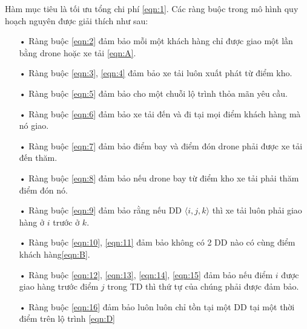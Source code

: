 \documentclass[a4paper,12pt]{report}
\begin{document}
Hàm mục tiêu là tối ưu tổng chi phí \eqref{eqn:1}.
Các ràng buộc trong mô hình quy hoạch nguyên được giải thích như sau:
\begin{itemize}
\item[•] Ràng buộc \eqref{eqn:2} đảm bảo mỗi một khách hàng chỉ được giao một lần bằng drone hoặc xe tải \eqref{eqn:A}.
\item[•] Ràng buộc \eqref{eqn:3}, \eqref{eqn:4} đảm bảo xe tải luôn xuất phát từ điểm kho.
\item[•] Ràng buộc \eqref{eqn:5} đảm bảo cho một chuỗi lộ trình thỏa mãn yêu cầu.
\item[•] Ràng buộc \eqref{eqn:6} đảm bảo xe tải đến và đi tại mọi điểm khách hàng mà nó giao.
\item[•] Ràng buộc \eqref{eqn:7} đảm bảo điểm bay và điểm đón drone phải được xe tải đến thăm.
\item[•] Ràng buộc \eqref{eqn:8} đảm bảo nếu drone bay từ điểm kho xe tải phải thăm điểm đón nó.
\item[•] Ràng buộc \eqref{eqn:9} đảm bảo rằng nếu \ac{DD} $\langle i,j,k \rangle $ thì xe tải luôn phải giao hàng ở $i$ trước ở $k$.
\item[•] Ràng buộc \eqref{eqn:10}, \eqref{eqn:11} đảm bảo không có 2 \ac{DD} nào có cùng điểm khách hàng\eqref{eqn:B}.
\item[•] Ràng buộc \eqref{eqn:12}, \eqref{eqn:13}, \eqref{eqn:14}, \eqref{eqn:15} đảm bảo nếu điểm $i$ được giao hàng trước điểm $j$ trong \ac{TD} thì thứ tự của chúng phải được đảm bảo.
\item[•] Ràng buộc \eqref{eqn:16} đảm bảo luôn luôn chỉ tồn tại một DD tại một thời điểm trên lộ trình \eqref{eqn:D}
\end{itemize}
\end{document}
